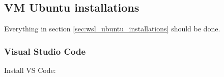 \subsection{VM Ubuntu installations}

Everything in section \ref{sec:wsl_ubuntu_installations} should be done.

\subsubsection{Visual Studio Code}
Install VS Code:

